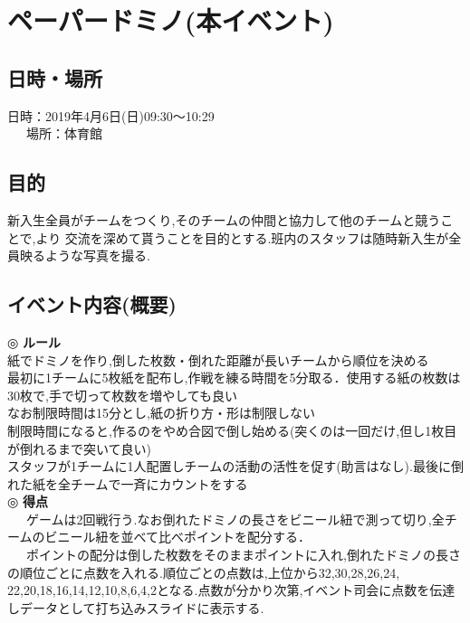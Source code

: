 \documentclass[a4j]{jarticle}
\begin{document}
\section{ペーパードミノ(本イベント)}
\subsection{日時・場所}
日時：2019年4月6日(日)09:30〜10:29\\
\ \ \ 場所：体育館\\
\subsection{目的}
新入生全員がチームをつくり,そのチームの仲間と協力して他のチームと競うことで,より
交流を深めて貰うことを目的とする.班内のスタッフは随時新入生が全員映るような写真を撮る.
\subsection{イベント内容(概要)} 
\hspace{-5mm}
◎ \textbf{ルール} \\
紙でドミノを作り,倒した枚数・倒れた距離が長いチームから順位を決める \\
最初に1チームに5枚紙を配布し,作戦を練る時間を5分取る．使用する紙の枚数は30枚で,手で切って枚数を増やしても良い \\
なお制限時間は15分とし,紙の折り方・形は制限しない \\
制限時間になると,作るのをやめ合図で倒し始める(突くのは一回だけ,但し1枚目が倒れるまで突いて良い) \\
スタッフが1チームに1人配置しチームの活動の活性を促す(助言はなし).最後に倒れた紙を全チームで一斉にカウントをする \\
◎ \textbf{得点} \\
\ \ \ ゲームは2回戦行う.なお倒れたドミノの長さをビニール紐で測って切り,全チームのビニール紐を並べて比べポイントを配分する．\\
\ \ \ ポイントの配分は倒した枚数をそのままポイントに入れ,倒れたドミノの長さの順位ごとに点数を入れる.順位ごとの点数は,上位から32,30,28,26,24,
22,20,18,16,14,12,10,8,6,4,2となる.点数が分かり次第,イベント司会に点数を伝達しデータとして打ち込みスライドに表示する.
\end{document}
